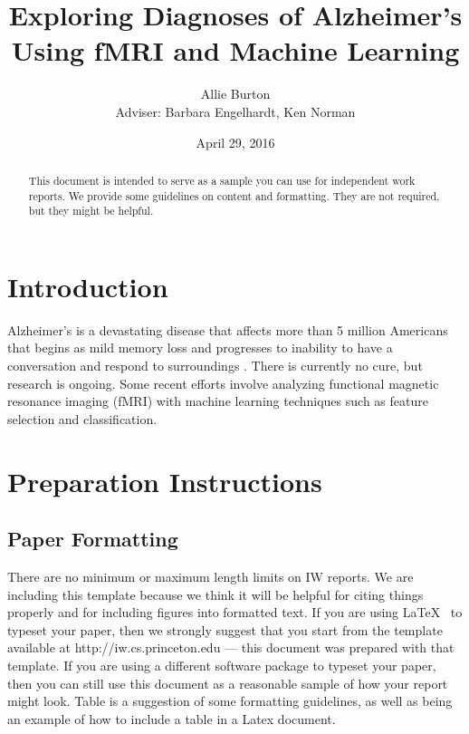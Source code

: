 \documentclass[pageno]{jpaper}
\begin{document}
\title{\myfont Exploring Diagnoses of Alzheimer's\\ Using fMRI and Machine Learning}

\author{Allie Burton\\Adviser: Barbara Engelhardt, Ken Norman}

\date{April 29, 2016}


\maketitle

\thispagestyle{empty}
\begin{abstract}
This document is intended to serve as a sample you can use for independent work reports.  We provide some guidelines on content and formatting.  They are not required, but they might be helpful.
\end{abstract}

\section{Introduction}

Alzheimer's is a devastating disease that affects more than 5 million Americans
that begins as mild memory loss and progresses to inability to have a conversation
and respond to surroundings \cite{AlzheimersAssociation2016,AlzheimersAssociation}.
There is currently no cure, but research is ongoing. Some recent efforts involve
analyzing functional magnetic resonance imaging (fMRI) with machine learning
techniques such as feature selection and classification. 

\section{Preparation Instructions}

\subsection{Paper Formatting}

There are no minimum or maximum length limits on IW reports.
We are including this template because we think it will be helpful
for citing things properly and for including figures into formatted
text.  If you are using \LaTeX~
to typeset your paper, then we strongly suggest
that you start from the template available at
http://iw.cs.princeton.edu --- this
document was prepared with that template.
If you are using a different software package to typeset your paper,
then you can still use this document as a reasonable sample of
how your report might look.  Table is a suggestion
of some formatting guidelines, as well as being an example of how to
include a table in a Latex document.
\end{document}
